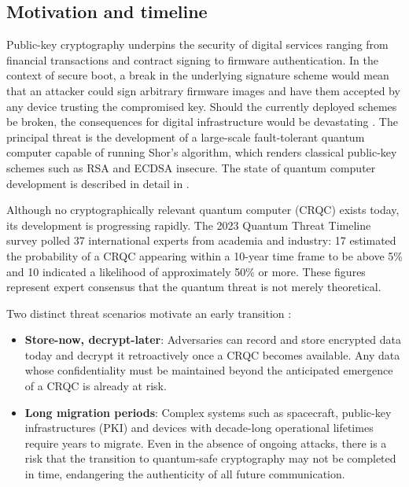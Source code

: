 \subsection{Motivation and timeline}
\label{subsection:bg-pq-motivation}

Public-key cryptography underpins the security of digital services ranging from financial transactions and contract signing to firmware authentication. In the context of secure boot, a break in the underlying signature scheme would mean that an attacker could sign arbitrary firmware images and have them accepted by any device trusting the compromised key. Should the currently deployed schemes be broken, the consequences for digital infrastructure would be devastating \cite{EU_post_quantum_transition, bsi_crypto_key_length}. The principal threat is the development of a large-scale fault-tolerant quantum computer capable of running Shor's algorithm, which renders classical public-key schemes such as RSA and ECDSA insecure. The state of quantum computer development is described in detail in \cite{state_of_quantum}.

Although no cryptographically relevant quantum computer (CRQC) exists today, its development is progressing rapidly. The 2023 Quantum Threat Timeline survey \cite{EU_post_quantum_transition} polled 37 international experts from academia and industry: 17 estimated the probability of a CRQC appearing within a 10-year time frame to be above 5\% and 10 indicated a likelihood of approximately 50\% or more. These figures represent expert consensus that the quantum threat is not merely theoretical.

Two distinct threat scenarios motivate an early transition \cite{EU_post_quantum_transition, bsi_crypto_key_length}:
\begin{itemize}
    \item \textbf{Store-now, decrypt-later}: Adversaries can record and store encrypted data today and decrypt it retroactively once a CRQC becomes available. Any data whose confidentiality must be maintained beyond the anticipated emergence of a CRQC is already at risk.
    \item \textbf{Long migration periods}: Complex systems such as spacecraft, public-key infrastructures (PKI) and devices with decade-long operational lifetimes require years to migrate. Even in the absence of ongoing attacks, there is a risk that the transition to quantum-safe cryptography may not be completed in time, endangering the authenticity of all future communication.
\end{itemize}

